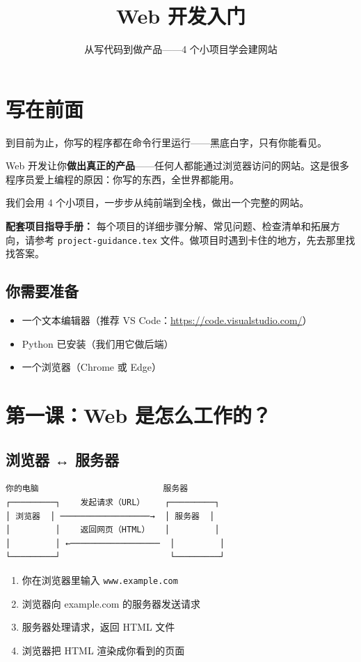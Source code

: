 \documentclass[a4paper,12pt]{ctexart}
\title{\textcolor{blue!70!black}{\Huge\textbf{Web 开发入门}}}
\author{从写代码到做产品——4 个小项目学会建网站}
\date{}
\begin{document}
\maketitle
\thispagestyle{empty}

\section*{写在前面}

到目前为止，你写的程序都在命令行里运行——黑底白字，只有你能看见。

Web 开发让你\textbf{做出真正的产品}——任何人都能通过浏览器访问的网站。这是很多程序员爱上编程的原因：你写的东西，全世界都能用。

我们会用 4 个小项目，一步步从纯前端到全栈，做出一个完整的网站。

\textbf{配套项目指导手册：} 每个项目的详细步骤分解、常见问题、检查清单和拓展方向，请参考 \texttt{project-guidance.tex} 文件。做项目时遇到卡住的地方，先去那里找找答案。

\subsection*{你需要准备}

\begin{itemize}
  \item 一个文本编辑器（推荐 VS Code：\url{https://code.visualstudio.com/}）
  \item Python 已安装（我们用它做后端）
  \item 一个浏览器（Chrome 或 Edge）
\end{itemize}

\section*{第一课：Web 是怎么工作的？}

\subsection*{浏览器 ↔ 服务器}

\begin{verbatim}
你的电脑                         服务器
┌─────────┐    发起请求（URL）    ┌─────────┐
│ 浏览器  │ ──────────────────→  │ 服务器  │
│         │    返回网页（HTML）   │         │
│         │ ←──────────────────  │         │
└─────────┘                      └─────────┘
\end{verbatim}

\begin{enumerate}
  \item 你在浏览器里输入 \texttt{www.example.com}
  \item 浏览器向 example.com 的服务器发送请求
  \item 服务器处理请求，返回 HTML 文件
  \item 浏览器把 HTML 渲染成你看到的页面
\end{enumerate}
\end{document}
